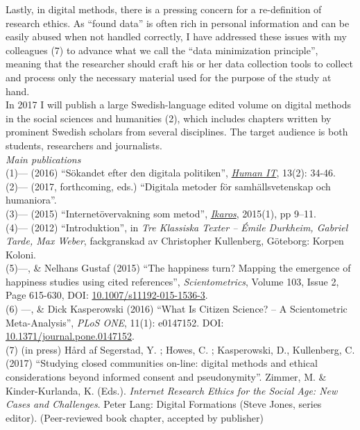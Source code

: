 \documentclass[a4paper,11pt,oneside]{article}
\begin{document}
     Lastly, in digital methods, there is a pressing concern for a re-definition
     of research ethics. As ``found data'' is often rich in personal information
     and can be easily abused when not handled correctly, I have addressed these
     issues with my colleagues (7) to advance what we call the ``data minimization principle'',
     meaning that the researcher should craft his or her data collection tools
     to collect and process only the necessary material used for the purpose of
     the study at hand.\\

     In 2017 I will publish a large Swedish-language edited volume on digital methods in the social
     sciences and humanities (2), which includes chapters written by prominent Swedish
     scholars from several disciplines. The target audience is both students,
     researchers and journalists.\\

      \noindent  \emph{Main publications} \\
      (1)--- (2016) ``Sökandet efter den digitala politiken'', \href{https://humanit.hb.se/article/view/504/572}{\emph{Human IT}}, 13(2): 34-46.\\
      (2)--- (2017, forthcoming, eds.) ``Digitala metoder för samhällsvetenskap och humaniora''.\\
      (3)--- (2015) ``Internetövervakning som metod'', \href{http://gup.ub.gu.se/records/fulltext/220443/220443.pdf}{\emph{Ikaros}}, 2015(1), pp 9–11.\\
      (4)--- (2012) ``Introduktion'', in \emph{Tre Klassiska Texter – Émile Durkheim, Gabriel Tarde, Max Weber}, fackgranskad av Christopher Kullenberg, Göteborg: Korpen Koloni.\\
      (5)---, \& Nelhans Gustaf (2015) ``The happiness turn? Mapping the emergence of happiness studies using cited references'', \emph{Scientometrics}, Volume 103, Issue 2, Page 615-630, DOI: \href{http://dx.doi.org/10.1007/s11192-015-1536-3}{10.1007/s11192-015-1536-3}.\\
      (6) ---, \& Dick Kasperowski (2016) ``What Is Citizen Science? – A Scientometric Meta-Analysis'', \emph{PLoS ONE}, 11(1): e0147152. DOI: \href{http://dx.doi.org/10.1371/journal.pone.0147152}{10.1371/journal.pone.0147152}.\\
      (7) (in press) Hård af Segerstad, Y. ; Howes, C. ; Kasperowski, D., Kullenberg, C. (2017) ``Studying closed communities on-line: digital methods and ethical considerations beyond informed consent and pseudonymity''. Zimmer, M. & Kinder-Kurlanda, K. (Eds.). \emph{Internet Research Ethics for the Social Age: New Cases and Challenges}. Peter Lang: Digital Formations (Steve Jones, series editor). (Peer-reviewed book chapter, accepted by publisher) \\
\end{document}
